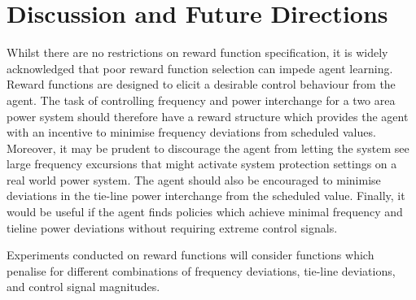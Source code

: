 \chapter{Discussion and Future Directions}

Whilst there are no restrictions on reward function specification, it is widely acknowledged that poor reward function selection can impede agent learning. Reward functions are designed to elicit a desirable control behaviour from the agent. The task of controlling frequency and power interchange for a two area power system should therefore have a reward structure which provides the agent with an incentive to minimise frequency deviations from scheduled values. Moreover, it may be prudent to discourage the agent from letting the system see large frequency excursions that might activate system protection settings on a real world power system. The agent should also be encouraged to minimise deviations in the tie-line power interchange from the scheduled value. Finally, it would be useful if the agent finds policies which achieve minimal frequency and tieline power deviations without requiring extreme control signals.

Experiments conducted on reward functions will consider functions which penalise for different combinations of frequency deviations, tie-line deviations, and control signal magnitudes.